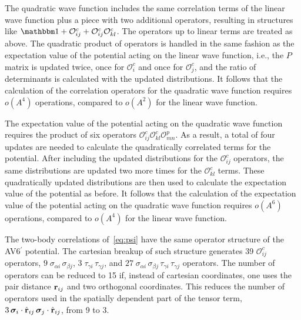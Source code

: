 \documentclass[aps,prc,twocolumn,superscriptaddress,floatfix]{revtex4-1}
\begin{document}
The quadratic wave function includes the same correlation terms 
of the linear wave function plus a piece with two additional operators,
resulting in structures like $\mathbbm1+\mathcal{O}^c_{ij}+\mathcal{O}^c_{ij}\mathcal{O}^c_{kl}$. 
The operators up to linear terms are treated as above. 
The quadratic product of operators is handled in the same fashion 
as the expectation value of the potential acting on the linear wave function, i.e., 
the $P$ matrix is updated twice, once for $\mathcal{O}^c_i$ and once 
for $\mathcal{O}^c_j$, and the ratio of determinants is calculated with 
the updated distributions. It follows that the calculation of the correlation 
operators for the quadratic wave function requires $o(A^4)$ operations, compared
to $o(A^2)$ for the linear wave function.

The expectation value of the potential acting on the quadratic wave function 
requires the product of six operators $\mathcal{O}^c_{ij}\mathcal{O}^c_{kl}\mathcal{O}^p_{mn}$. 
As a result, a total of four updates are needed to calculate the quadratically correlated 
terms for the potential. After including the updated 
distributions for the $\mathcal{O}^c_{ij}$ operators, the same distributions are updated 
two more times for the $\mathcal{O}^c_{kl}$ terms. These quadratically updated distributions 
are then used to calculate the expectation value of the potential as before. 
It follows that the calculation of the expectation value of the potential acting 
on the quadratic wave function requires $o(A^6)$ operations, compared
to $o(A^4)$ for the linear wave function.

The two-body correlations of~\cref{eq:psi} have the same operator structure of the 
AV6$^\prime$ potential. The cartesian breakup of such structure generates 39 $\mathcal O^c_{ij}$ operators,  
$9\;\sigma_{\alpha i}\,\sigma_{\beta j}$, $3\;\tau_{\gamma i}\,\tau_{\gamma j}$,
and $27\;\sigma_{\alpha i}\,\sigma_{\beta j}\,\tau_{\gamma i}\,\tau_{\gamma j}$ operators. 
The number of operators can be reduced to 15 if, instead of cartesian coordinates, 
one uses the pair distance $\vb{r}_{ij}$ and two orthogonal coordinates. 
This reduces the number of operators used in the spatially dependent part of the tensor term, $3\,\bm\sigma_i\cdot\hat{\vb{r}}_{ij}\,\bm\sigma_j\cdot\hat{\vb{r}}_{ij}$, from 9 to 3.




\end{document}
